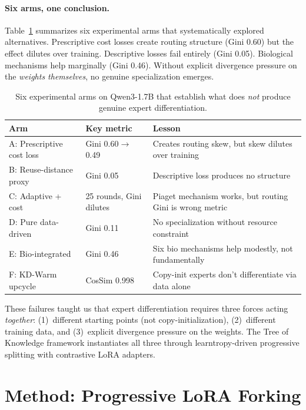 \documentclass{article}
\newcommand{\tok}{Tree of Knowledge}
\begin{document}
\paragraph{Six arms, one conclusion.}
Table~\ref{tab:lessons} summarizes six experimental arms that systematically
explored alternatives. Prescriptive cost losses create routing structure (Gini
0.60) but the effect dilutes over training. Descriptive losses fail entirely
(Gini 0.05). Biological mechanisms help marginally (Gini 0.46). Without
explicit divergence pressure on the \emph{weights themselves}, no genuine
specialization emerges.

\begin{table}[t]
\centering
\caption{Six experimental arms on Qwen3-1.7B that establish what does \emph{not}
produce genuine expert differentiation.}
\label{tab:lessons}
\begin{tabular}{@{}llp{6.5cm}@{}}
\toprule
Arm & Key metric & Lesson \\
\midrule
A: Prescriptive cost loss  & Gini 0.60$\to$0.49 & Creates routing skew, but skew dilutes over training \\
B: Reuse-distance proxy     & Gini 0.05           & Descriptive loss produces no structure \\
C: Adaptive + cost          & 25 rounds, Gini dilutes & Piaget mechanism works, but routing Gini is wrong metric \\
D: Pure data-driven         & Gini 0.11           & No specialization without resource constraint \\
E: Bio-integrated           & Gini 0.46           & Six bio mechanisms help modestly, not fundamentally \\
F: KD-Warm upcycle          & CosSim 0.998        & Copy-init experts don't differentiate via data alone \\
\bottomrule
\end{tabular}
\end{table}

These failures taught us that expert differentiation requires three forces acting
\emph{together}: (1)~different starting points (not copy-initialization),
(2)~different training data, and (3)~explicit divergence pressure on the weights.
The \tok{} framework instantiates all three through learntropy-driven progressive
splitting with contrastive LoRA adapters.

\section{Method: Progressive LoRA Forking}
\label{sec:method}
\end{document}
